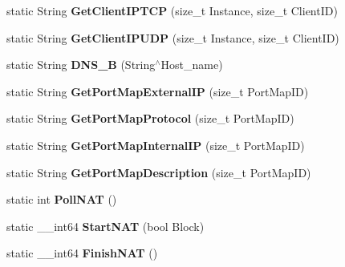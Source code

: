 \begin{DoxyCompactItemize}
\item 
\hypertarget{structmn_c_l_r_a9d8dcd6d50e80f68bd97551b7998ced9}{
static String {\bfseries GetClientIPTCP} (size\_\-t Instance, size\_\-t ClientID)}
\label{structmn_c_l_r_a9d8dcd6d50e80f68bd97551b7998ced9}

\item 
\hypertarget{structmn_c_l_r_a6980bd0f84b15e725fef92f8c47fa56c}{
static String {\bfseries GetClientIPUDP} (size\_\-t Instance, size\_\-t ClientID)}
\label{structmn_c_l_r_a6980bd0f84b15e725fef92f8c47fa56c}

\item 
\hypertarget{structmn_c_l_r_a6831d65260c6a6f8340867d026cf209f}{
static String {\bfseries DNS\_\-B} (String$^\wedge$Host\_\-name)}
\label{structmn_c_l_r_a6831d65260c6a6f8340867d026cf209f}

\item 
\hypertarget{structmn_c_l_r_ab4cfeb47e4fd5260ede7618279f6163e}{
static String {\bfseries GetPortMapExternalIP} (size\_\-t PortMapID)}
\label{structmn_c_l_r_ab4cfeb47e4fd5260ede7618279f6163e}

\item 
\hypertarget{structmn_c_l_r_af86c0abcdeb9ace6488d62ed909e5e81}{
static String {\bfseries GetPortMapProtocol} (size\_\-t PortMapID)}
\label{structmn_c_l_r_af86c0abcdeb9ace6488d62ed909e5e81}

\item 
\hypertarget{structmn_c_l_r_abefd5c38ba7ac0da54fba0952f31c978}{
static String {\bfseries GetPortMapInternalIP} (size\_\-t PortMapID)}
\label{structmn_c_l_r_abefd5c38ba7ac0da54fba0952f31c978}

\item 
\hypertarget{structmn_c_l_r_ab7f4c88d15dbeae6e47b172c916ca1b4}{
static String {\bfseries GetPortMapDescription} (size\_\-t PortMapID)}
\label{structmn_c_l_r_ab7f4c88d15dbeae6e47b172c916ca1b4}

\item 
\hypertarget{structmn_c_l_r_aa15bb70d0c2d24c679815c602a0ba97a}{
static int {\bfseries PollNAT} ()}
\label{structmn_c_l_r_aa15bb70d0c2d24c679815c602a0ba97a}

\item 
\hypertarget{structmn_c_l_r_a1f8a3e9dea45b1cc42e9562f31be9219}{
static \_\-\_\-int64 {\bfseries StartNAT} (bool Block)}
\label{structmn_c_l_r_a1f8a3e9dea45b1cc42e9562f31be9219}

\item 
\hypertarget{structmn_c_l_r_ae2846bb5cc3e1f120d9f8f36554cb6ec}{
static \_\-\_\-int64 {\bfseries FinishNAT} ()}
\label{structmn_c_l_r_ae2846bb5cc3e1f120d9f8f36554cb6ec}


\end{DoxyCompactItemize}
